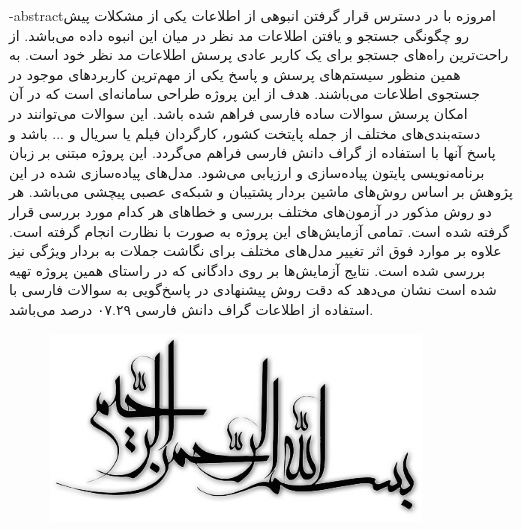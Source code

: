 

\fa-abstract{امروزه با در دسترس قرار گرفتن انبوهی از اطلاعات یکی از مشکلات پیش رو چگونگی جستجو و یافتن اطلاعات مد نظر در میان این انبوه داده می‌باشد. از راحت‌ترین راه‌های جستجو برای یک کاربر عادی پرسش اطلاعات مد نظر خود است. به همین منظور سیستم‌های پرسش و پاسخ یکی از مهم‌ترین کاربردهای موجود در جستجوی اطلاعات می‌باشند. 
	هدف از این پروژه طراحی سامانه‌ای است که در آن امکان پرسش سوالات ساده فارسی فراهم شده باشد. این سوالات می‌توانند در دسته‌بندی‌های مختلف از جمله پایتخت کشور، کارگردان فیلم یا سریال و ... باشد و پاسخ آنها با استفاده از گراف دانش فارسی فراهم می‌گردد. این پروژه مبتنی بر زبان برنامه‌نویسی پایتون پیاده‌سازی و ارزیابی می‌شود. مدل‌های پیاده‌سازی شده در این پژوهش بر اساس روش‌های ماشین بردار پشتیبان و شبکه‌ی عصبی پیچشی می‌باشد. هر دو روش مذکور در آزمون‌های مختلف بررسی و خطاهای هر کدام مورد بررسی قرار گرفته شده است. تمامی آزمایش‌های این پروژه به صورت با نظارت انجام گرفته است. علاوه بر موارد فوق اثر تغییر مدل‌های مختلف برای نگاشت جملات به بردار ویژگی نیز بررسی شده است. نتایج آزمایش‌ها بر روی دادگانی که در راستای همین پروژه تهیه شده است نشان می‌دهد که دقت روش پیشنهادی در پاسخ‌گویی به سوالات فارسی با استفاده از اطلاعات گراف دانش فارسی ۰۷.۲۹ درصد می‌باشد.
}



\AUTtitle
\vspace*{7cm}
\thispagestyle{empty}
\begin{center}
\includegraphics[height=5cm,width=12cm]{besm}
\end{center}